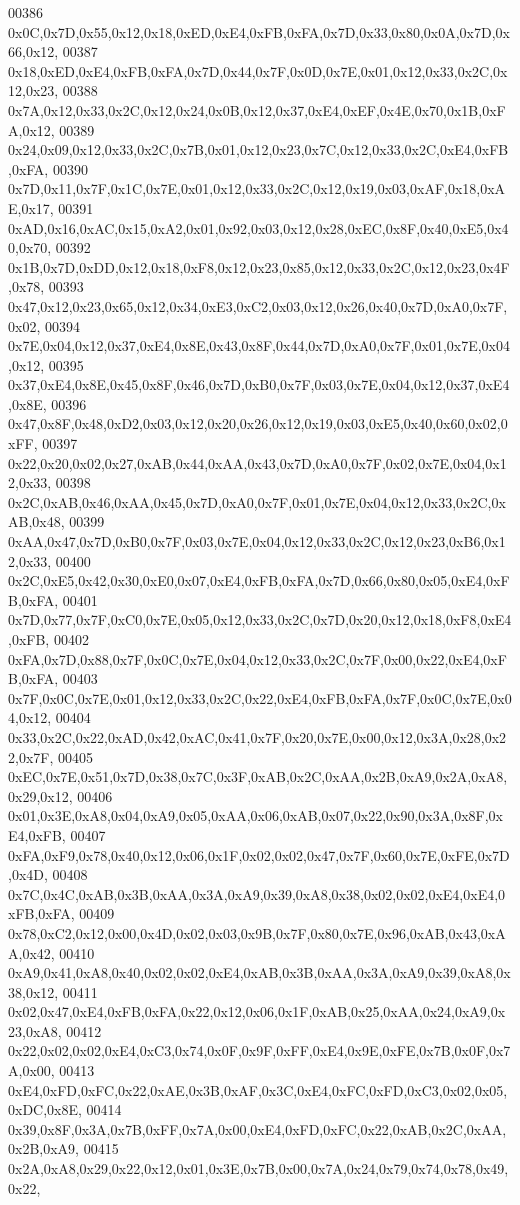 \begin{DoxyCode}
00386 0x0C,0x7D,0x55,0x12,0x18,0xED,0xE4,0xFB,0xFA,0x7D,0x33,0x80,0x0A,0x7D,0x66,0x12,
00387 0x18,0xED,0xE4,0xFB,0xFA,0x7D,0x44,0x7F,0x0D,0x7E,0x01,0x12,0x33,0x2C,0x12,0x23,
00388 0x7A,0x12,0x33,0x2C,0x12,0x24,0x0B,0x12,0x37,0xE4,0xEF,0x4E,0x70,0x1B,0xFA,0x12,
00389 0x24,0x09,0x12,0x33,0x2C,0x7B,0x01,0x12,0x23,0x7C,0x12,0x33,0x2C,0xE4,0xFB,0xFA,
00390 0x7D,0x11,0x7F,0x1C,0x7E,0x01,0x12,0x33,0x2C,0x12,0x19,0x03,0xAF,0x18,0xAE,0x17,
00391 0xAD,0x16,0xAC,0x15,0xA2,0x01,0x92,0x03,0x12,0x28,0xEC,0x8F,0x40,0xE5,0x40,0x70,
00392 0x1B,0x7D,0xDD,0x12,0x18,0xF8,0x12,0x23,0x85,0x12,0x33,0x2C,0x12,0x23,0x4F,0x78,
00393 0x47,0x12,0x23,0x65,0x12,0x34,0xE3,0xC2,0x03,0x12,0x26,0x40,0x7D,0xA0,0x7F,0x02,
00394 0x7E,0x04,0x12,0x37,0xE4,0x8E,0x43,0x8F,0x44,0x7D,0xA0,0x7F,0x01,0x7E,0x04,0x12,
00395 0x37,0xE4,0x8E,0x45,0x8F,0x46,0x7D,0xB0,0x7F,0x03,0x7E,0x04,0x12,0x37,0xE4,0x8E,
00396 0x47,0x8F,0x48,0xD2,0x03,0x12,0x20,0x26,0x12,0x19,0x03,0xE5,0x40,0x60,0x02,0xFF,
00397 0x22,0x20,0x02,0x27,0xAB,0x44,0xAA,0x43,0x7D,0xA0,0x7F,0x02,0x7E,0x04,0x12,0x33,
00398 0x2C,0xAB,0x46,0xAA,0x45,0x7D,0xA0,0x7F,0x01,0x7E,0x04,0x12,0x33,0x2C,0xAB,0x48,
00399 0xAA,0x47,0x7D,0xB0,0x7F,0x03,0x7E,0x04,0x12,0x33,0x2C,0x12,0x23,0xB6,0x12,0x33,
00400 0x2C,0xE5,0x42,0x30,0xE0,0x07,0xE4,0xFB,0xFA,0x7D,0x66,0x80,0x05,0xE4,0xFB,0xFA,
00401 0x7D,0x77,0x7F,0xC0,0x7E,0x05,0x12,0x33,0x2C,0x7D,0x20,0x12,0x18,0xF8,0xE4,0xFB,
00402 0xFA,0x7D,0x88,0x7F,0x0C,0x7E,0x04,0x12,0x33,0x2C,0x7F,0x00,0x22,0xE4,0xFB,0xFA,
00403 0x7F,0x0C,0x7E,0x01,0x12,0x33,0x2C,0x22,0xE4,0xFB,0xFA,0x7F,0x0C,0x7E,0x04,0x12,
00404 0x33,0x2C,0x22,0xAD,0x42,0xAC,0x41,0x7F,0x20,0x7E,0x00,0x12,0x3A,0x28,0x22,0x7F,
00405 0xEC,0x7E,0x51,0x7D,0x38,0x7C,0x3F,0xAB,0x2C,0xAA,0x2B,0xA9,0x2A,0xA8,0x29,0x12,
00406 0x01,0x3E,0xA8,0x04,0xA9,0x05,0xAA,0x06,0xAB,0x07,0x22,0x90,0x3A,0x8F,0xE4,0xFB,
00407 0xFA,0xF9,0x78,0x40,0x12,0x06,0x1F,0x02,0x02,0x47,0x7F,0x60,0x7E,0xFE,0x7D,0x4D,
00408 0x7C,0x4C,0xAB,0x3B,0xAA,0x3A,0xA9,0x39,0xA8,0x38,0x02,0x02,0xE4,0xE4,0xFB,0xFA,
00409 0x78,0xC2,0x12,0x00,0x4D,0x02,0x03,0x9B,0x7F,0x80,0x7E,0x96,0xAB,0x43,0xAA,0x42,
00410 0xA9,0x41,0xA8,0x40,0x02,0x02,0xE4,0xAB,0x3B,0xAA,0x3A,0xA9,0x39,0xA8,0x38,0x12,
00411 0x02,0x47,0xE4,0xFB,0xFA,0x22,0x12,0x06,0x1F,0xAB,0x25,0xAA,0x24,0xA9,0x23,0xA8,
00412 0x22,0x02,0x02,0xE4,0xC3,0x74,0x0F,0x9F,0xFF,0xE4,0x9E,0xFE,0x7B,0x0F,0x7A,0x00,
00413 0xE4,0xFD,0xFC,0x22,0xAE,0x3B,0xAF,0x3C,0xE4,0xFC,0xFD,0xC3,0x02,0x05,0xDC,0x8E,
00414 0x39,0x8F,0x3A,0x7B,0xFF,0x7A,0x00,0xE4,0xFD,0xFC,0x22,0xAB,0x2C,0xAA,0x2B,0xA9,
00415 0x2A,0xA8,0x29,0x22,0x12,0x01,0x3E,0x7B,0x00,0x7A,0x24,0x79,0x74,0x78,0x49,0x22,

\end{DoxyCode}
